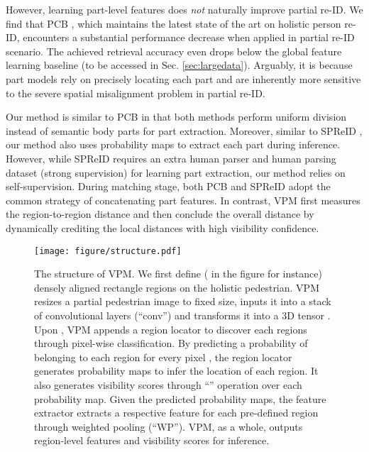 \documentclass[10pt,twocolumn,letterpaper]{article}
\begin{document}
However, learning part-level features does \emph {not} naturally improve partial re-ID. We find that PCB \cite{PCB_ECCV}, which maintains the latest state of the art on holistic person re-ID, encounters a substantial performance decrease when applied in partial re-ID scenario. The achieved retrieval accuracy even drops below the global feature learning baseline (to be accessed in Sec. \ref{sec:largedata}). Arguably, it is because part models rely on precisely locating each part and are inherently more sensitive to the severe spatial misalignment problem in partial re-ID. 

Our method is similar to PCB in that both methods perform uniform division instead of semantic body parts for part extraction. Moreover, similar to SPReID \cite{cvpr2018:SPReID}, our method also uses probability maps to extract each part during inference. However, while SPReID requires an extra human parser and human parsing dataset (strong supervision) for learning part extraction, our method relies on self-supervision.  During matching stage, both PCB and SPReID adopt the common strategy of concatenating part features. In contrast, VPM first measures the region-to-region distance and then conclude the overall distance by dynamically crediting the local distances with high visibility confidence. 


\begin{figure*}[t]
\setlength{\abovecaptionskip}{-0.2cm} 
\setlength{\belowcaptionskip}{-0.1cm}
\begin{center}
\texttt{[image: figure/structure.pdf]}
\end{center}
   \caption{The structure of VPM. We first define  ( in the figure for instance) densely aligned rectangle regions on the holistic pedestrian. VPM resizes a partial pedestrian image to fixed size, inputs it into a stack of convolutional layers (``conv'') and transforms it into a 3D tensor . Upon , VPM appends a region locator to discover each regions through pixel-wise classification. By predicting a probability of belonging to each region for every pixel , the region locator generates  probability maps to infer the location of each region. It also generates  visibility scores through ``'' operation over each probability map. Given the predicted probability maps, the feature extractor extracts a respective feature for each pre-defined region through weighted pooling (``WP''). VPM, as a whole, outputs  region-level features and  visibility scores for inference.}
\label{fig:structure}
\end{figure*}
\end{document}
